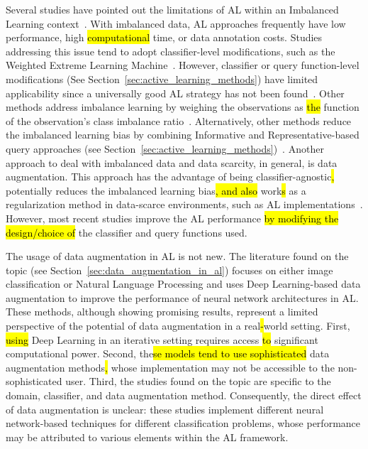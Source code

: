 \documentclass[preprint, 12pt]{elsarticle}
\begin{document}
Several studies have pointed out the limitations of AL within an Imbalanced
Learning context~\cite{Yu2019}. With imbalanced data, AL approaches frequently
have low performance, high \hl{computational} time, or\hl{ }data annotation
costs.  Studies addressing this issue tend to adopt classifier-level
modifications, such as the Weighted Extreme Learning Machine~\cite{Yu2019,
Zong2013, Qin2021}. However, classifier or query function-level modifications
(See Section~\ref{sec:active_learning_methods}) have limited applicability
since a universally good AL strategy has not been found~\cite{Sener2018}.
Other methods address imbalance learning by weighing the observations as
\hl{the} function of the observation's class imbalance ratio~\cite{Liu2021}.
Alternatively, other methods\hl{ }reduce the imbalanced learning bias by
combining Informative and Representative-based query approaches (see
Section~\ref{sec:active_learning_methods})~\cite{Tharwat2020}. Another
approach to deal with imbalanced data and data scarcity, in general, is data
augmentation. This approach has the advantage of being\hl{
}classifier-agnostic\hl{, }potentially reduces the imbalanced learning
bias\hl{, and also} work\hl{s} as a regularization method in data-scarce
environments, such as AL implementations~\cite{Kim2021}. However, most recent
studies\hl{ }improve the AL performance \hl{by modifying the design/choice of}
the classifier and query functions used.
 
The usage of data augmentation in AL is not new. The literature found on the
topic (see Section~\ref{sec:data_augmentation_in_al}) focuses on either image
classification or Natural Language Processing and uses Deep Learning-based
data augmentation to improve the performance of neural network architectures
in AL\@. These methods, although showing promising results, represent a
limited perspective of the potential of data augmentation in a real\hl{-}world
setting. First, \hl{using} Deep Learning in an iterative setting requires\hl{
}access \hl{to} significant computational power. Second, the\hl{se models tend
to use sophisticated} data augmentation methods\hl{,} whose implementation may
not be accessible to the non-sophisticated user. Third, the studies found on
the topic are specific to the domain, classifier, and data augmentation
method.  Consequently, the direct effect of data augmentation is unclear:
these studies implement different neural network-based techniques for
different classification problems, whose performance may be attributed to
various elements within the AL framework.
\end{document}
